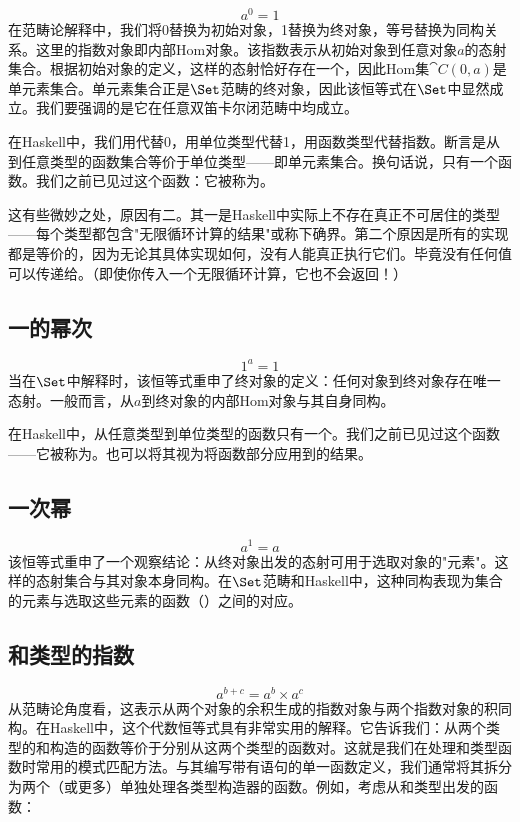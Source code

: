 $$a^{0} = 1$$
在范畴论解释中，我们将0替换为初始对象，1替换为终对象，等号替换为同构关系。这里的指数对象即内部Hom对象。该指数表示从初始对象到任意对象$a$的态射集合。根据初始对象的定义，这样的态射恰好存在一个，因此Hom集$\cat{C}(0, a)$是单元素集合。单元素集合正是$\Set$范畴的终对象，因此该恒等式在$\Set$中显然成立。我们要强调的是它在任意双笛卡尔闭范畴中均成立。

在Haskell中，我们用代替0，用单位类型\code{()}代替1，用函数类型代替指数。断言是从到任意类型的函数集合等价于单位类型——即单元素集合。换句话说，只有一个函数。我们之前已见过这个函数：它被称为。

这有些微妙之处，原因有二。其一是Haskell中实际上不存在真正不可居住的类型——每个类型都包含"无限循环计算的结果"或称下确界。第二个原因是所有的实现都是等价的，因为无论其具体实现如何，没有人能真正执行它们。毕竟没有任何值可以传递给。（即使你传入一个无限循环计算，它也不会返回！）

\subsection{一的幂次}

$$1^{a} = 1$$
当在$\Set$中解释时，该恒等式重申了终对象的定义：任何对象到终对象存在唯一态射。一般而言，从$a$到终对象的内部Hom对象与其自身同构。

在Haskell中，从任意类型到单位类型的函数只有一个。我们之前已见过这个函数——它被称为。也可以将其视为将函数部分应用到\code{()}的结果。

\subsection{一次幂}

$$a^{1} = a$$
该恒等式重申了一个观察结论：从终对象出发的态射可用于选取对象的"元素"。这样的态射集合与其对象本身同构。在$\Set$范畴和Haskell中，这种同构表现为集合的元素与选取这些元素的函数（）之间的对应。

\subsection{和类型的指数}

$$a^{b+c} = a^{b} \times a^{c}$$
从范畴论角度看，这表示从两个对象的余积生成的指数对象与两个指数对象的积同构。在Haskell中，这个代数恒等式具有非常实用的解释。它告诉我们：从两个类型的和构造的函数等价于分别从这两个类型的函数对。这就是我们在处理和类型函数时常用的模式匹配方法。与其编写带有语句的单一函数定义，我们通常将其拆分为两个（或更多）单独处理各类型构造器的函数。例如，考虑从和类型出发的函数：


